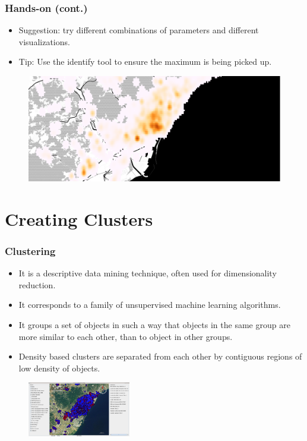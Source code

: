 \documentclass[hyperref={pdfpagelabels=true}]{beamer}
\begin{document}
\begin{frame}
\frametitle{Hands-on (cont.)}

\begin{itemize}  
    \item<1->Suggestion: try different combinations of parameters and different visualizations.    
    \item<1->Tip: Use the identify tool to ensure the maximum is being picked up.
\end{itemize}  

  \begin{figure}  
      \includegraphics[width=\textwidth]{heatmap1.png}\\
    \end{figure}         

\end{frame}

\section{Creating Clusters} 
\begin{frame}
\frametitle{Clustering}
\small{ 
    \begin{itemize}
      \item<1->It is a descriptive data mining technique, often used for dimensionality reduction.
      \item<2->It corresponds to a family of unsupervised machine learning algorithms.      
      \item<3->It groups a set of objects in such a way that objects in the same group are more similar to each other, than to object in other groups.
      \item<4->Density based clusters are separated from each other by contiguous regions of low density of objects.
    \end{itemize}    
}
  \begin{figure}  
      \includegraphics[width=0.4\textwidth]{screenshot1.png}\\
    \end{figure}         
    
\end{frame}
\end{document}
